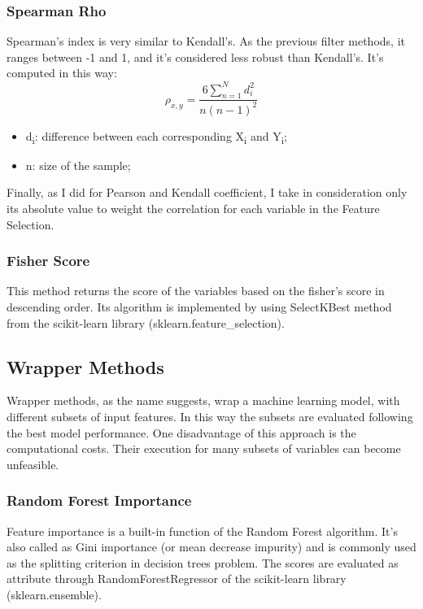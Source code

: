 \subsubsection{Spearman Rho}
Spearman’s index is very similar to Kendall’s. As the previous filter methods, it ranges between -1 and 1, and it's considered less robust than Kendall's.
It's computed in this way:
\begin{equation}
\rho_{x,y} = \frac{6\sum_{n=1}^{N} d_i^2}{n(n-1)^2}
\end{equation}
\begin{itemize}
\item d\textsubscript{i}: difference between each corresponding X\textsubscript{i} and Y\textsubscript{i};
\item n: size of the sample;
\end{itemize}

Finally, as I did for Pearson and Kendall coefficient, I take in consideration only its absolute value to weight the correlation for each variable in the Feature Selection.

\subsubsection{Fisher Score}
This method returns the score of the variables based on the fisher’s score in descending order. \newline
Its algorithm is implemented by using SelectKBest method from the scikit-learn library (sklearn.feature\_selection).
\pagebreak
\subsection{Wrapper Methods}
Wrapper methods, as the name suggests, wrap a machine learning model, with different subsets of input features. In this way the subsets are evaluated following the best model performance.
One disadvantage of this approach is the computational costs.\newline
Their execution for many subsets of variables can become unfeasible. 
\bigbreak
\subsubsection{Random Forest Importance}
Feature importance is a built-in function of the Random Forest algorithm. It's also called as Gini importance (or mean decrease impurity) and is commonly used as the splitting criterion in decision trees problem. The scores are evaluated as attribute through RandomForestRegressor of the scikit-learn library (sklearn.ensemble).
\bigbreak\bigbreak\bigbreak
